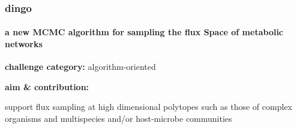 \documentclass{beamer}
\begin{document}


   \begin{darkframes}
      \begin{frame}
         \frametitle{\textbf{dingo} }
         \framesubtitle{a new MCMC algorithm for sampling the flux Space of metabolic networks }


         \small

         \textbf{challenge category: } algorithm-oriented

         \bigskip

         \textbf{aim \& contribution: }





         support flux sampling at high dimensional polytopes 
         such as those of complex organisms and multispecies and/or host-microbe communities 


      \end{frame} 
   \end{darkframes}
\end{document}
